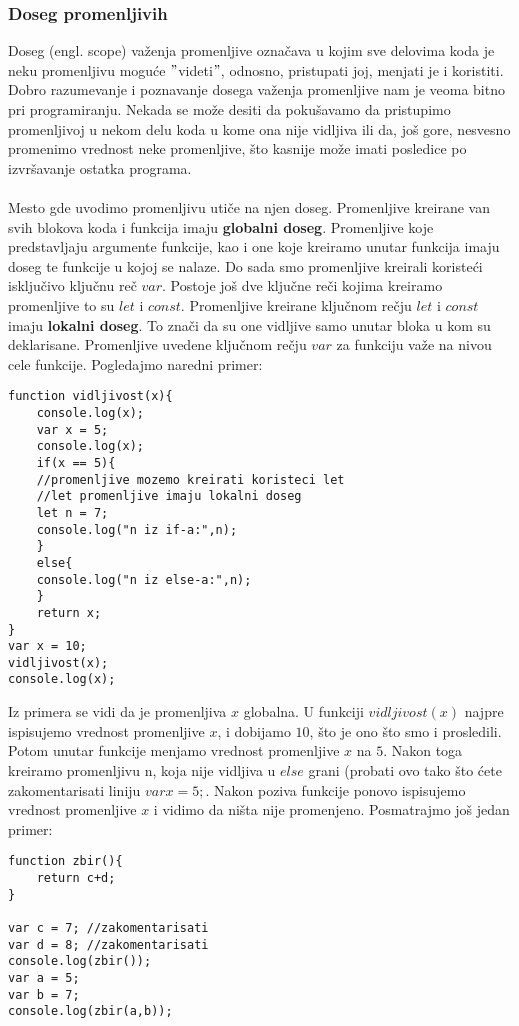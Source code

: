 \subsubsection{Doseg promenljivih}
Doseg (engl. scope) važenja promenljive označava u kojim sve delovima koda je neku promenljivu moguće $"$videti$"$, odnosno, pristupati joj, menjati je i koristiti. Dobro razumevanje i poznavanje dosega važenja promenljive nam je veoma bitno pri programiranju. Nekada se može desiti da pokušavamo da pristupimo promenljivoj u nekom delu koda u kome ona nije vidljiva ili da, još gore, nesvesno promenimo vrednost neke promenljive, što kasnije može imati posledice po izvršavanje ostatka programa.\\\\
Mesto gde uvodimo promenljivu utiče na njen doseg. Promenljive kreirane van svih blokova koda i funkcija imaju \textbf{globalni doseg}. Promenljive koje predstavljaju argumente funkcije, kao i one koje kreiramo unutar funkcija imaju doseg te funkcije u kojoj se nalaze.
Do sada smo promenljive kreirali koristeći isključivo ključnu reč $var$. Postoje još dve ključne reči kojima kreiramo promenljive to su $let$ i $const$. Promenljive kreirane ključnom rečju $let$ i $const$ imaju \textbf{lokalni doseg}. To znači da su one vidljive samo unutar bloka u kom su deklarisane. Promenljive uvedene ključnom rečju $var$ za funkciju važe na nivou cele funkcije. Pogledajmo naredni primer:
\begin{lstlisting}[backgroundcolor = \color{lightgray}, breaklines=true]
function vidljivost(x){
	console.log(x);
    var x = 5;
	console.log(x);
    if(x == 5){
	//promenljive mozemo kreirati koristeci let
	//let promenljive imaju lokalni doseg
	let n = 7;
	console.log("n iz if-a:",n);
	}
    else{
	console.log("n iz else-a:",n);   
    }
    return x;
}
var x = 10;
vidljivost(x);
console.log(x);
\end{lstlisting}
Iz primera se vidi da je promenljiva $x$ globalna. U funkciji $vidljivost(x)$ najpre ispisujemo vrednost promenljive $x$, i dobijamo $10$, što je ono što smo i prosledili. Potom unutar funkcije menjamo vrednost promenljive $x$ na $5$. Nakon toga kreiramo promenljivu n, koja nije vidljiva u $else$ grani (probati ovo tako što ćete zakomentarisati liniju $var x = 5;$. Nakon poziva funkcije ponovo ispisujemo vrednost promenljive $x$ i vidimo da ništa nije promenjeno. Posmatrajmo još jedan primer:
\begin{lstlisting}[backgroundcolor = \color{lightgray}, breaklines=true]
function zbir(){
	return c+d;
}

var c = 7; //zakomentarisati
var d = 8; //zakomentarisati
console.log(zbir());
var a = 5;
var b = 7;
console.log(zbir(a,b));
\end{lstlisting}


